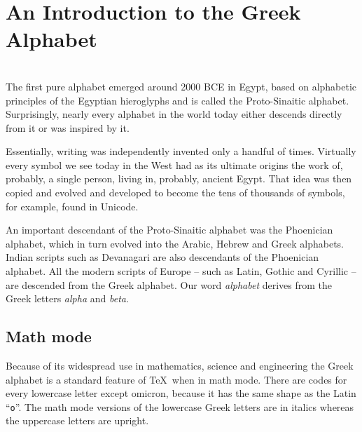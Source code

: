 \section{An Introduction to the Greek Alphabet}
 \\
The first pure alphabet emerged around 2000 BCE in Egypt, based on alphabetic principles of the Egyptian hieroglyphs and is called the Proto-Sinaitic alphabet. Surprisingly, nearly every alphabet in the world today either descends directly from it or was inspired by it.

Essentially, writing was independently invented only a handful of times. Virtually every symbol we see today in the West had as its ultimate origins the work of, probably, a single person, living in, probably, ancient Egypt. That idea was then copied and evolved and developed to become the tens of thousands of symbols, for example, found in Unicode.

An important descendant of the Proto-Sinaitic alphabet was the Phoenician alphabet, which in turn evolved into the Arabic, Hebrew and Greek alphabets. Indian scripts such as Devanagari are also descendants of the Phoenician alphabet. All the modern scripts of Europe -- such as Latin, Gothic and Cyrillic -- are descended from the Greek alphabet. Our word \emph{alphabet} derives from the Greek letters \emph{alpha} and \emph{beta}.

\subsection{Math mode}
Because of its widespread use in mathematics, science and engineering the Greek alphabet is a standard feature of \TeX\ when in math mode. There are codes for every lowercase letter except omicron, because it has the same shape as the Latin ``\texttt{o}''. The math mode versions of the lowercase Greek letters are in italics whereas the uppercase letters are upright.

